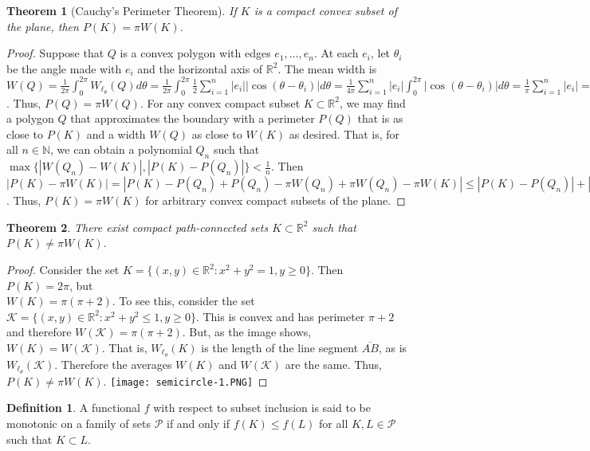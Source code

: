 \documentclass[oneside]{book}
\newtheorem{theorem}{Theorem}[section]
\theoremstyle{definition}
\newtheorem{definition}{Definition}[section]
\begin{document}
\begin{theorem}[Cauchy's Perimeter Theorem]
If $K$ is a compact convex subset of the plane, then $P(K) = \pi W(K)$.
\end{theorem}
\begin{proof}
Suppose that $Q$ is a convex polygon with edges $e_1,\hdots, e_n$. At each $e_i$, let $\theta_i$ be the angle made with $e_i$ and the horizontal axis of $\mathbb{R}^2$. The mean width is $W(Q) = \frac{1}{2\pi}\int_{0}^{2\pi} W_{\ell_\theta}(Q)d\theta = \frac{1}{2\pi} \int_{0}^{2\pi} \frac{1}{2} \sum_{i=1}^{n} |e_i||\cos(\theta-\theta_i)|d\theta = \frac{1}{4\pi}\sum_{i=1}^{n} |e_i|\int_{0}^{2\pi} |\cos(\theta-\theta_i)|d\theta = \frac{1}{\pi} \sum_{i=1}^{n} |e_i| = \frac{1}{\pi} P(Q)$. Thus, $P(Q) = \pi W(Q)$. For any convex compact subset $K\subset \mathbb{R}^2$, we may find a polygon $Q$ that approximates the boundary with a perimeter $P(Q)$ that is as close to $P(K)$ and a width $W(Q)$ as close to $W(K)$ as desired. That is, for all $n\in \mathbb{N}$, we can obtain a polynomial $Q_n$ such that $\max\{|W(Q_n)-W(K)|,|P(K)-P(Q_n)|\}< \frac{1}{n}$. Then $|P(K)-\pi W(K)| = |P(K) - P(Q_n)+P(Q_n)-\pi W(Q_n)+\pi W(Q_n)-\pi W(K)| \leq |P(K)-P(Q_n)|+|P(Q_n)-\pi W(Q_n)|+\pi|W(Q_n)-W(K)| < \frac{1}{n} + 0 + \frac{\pi}{n} = \frac{1+\pi}{n} \rightarrow 0$. Thus, $P(K) = \pi W(K)$ for arbitrary convex compact subsets of the plane.
\end{proof}
 
\begin{theorem}
There exist compact path-connected sets $K\subset \mathbb{R}^2$ such that $P(K) \ne \pi W(K)$.
\end{theorem}
\begin{proof}
Consider the set $K = \{(x,y) \in \mathbb{R}^2: x^2+y^2=1, y\geq 0\}$. Then $P(K) = 2\pi$, but \\ $W(K) = \pi(\pi+2)$. To see this, consider the set $\mathcal{K} = \{(x,y)\in \mathbb{R}^2: x^2 + y^2 \leq 1, y\geq 0\}$. This is convex and has perimeter $\pi+2$ and therefore $W(\mathcal{K}) = \pi(\pi+2)$. But, as the image shows, $W(K) = W(\mathcal{K})$. That is, $W_{\ell_{\theta}}(K)$ is the length of the line segment $\overline{AB}$, as is $W_{\ell_{\theta}}(\mathcal{K})$. Therefore the averages $W(K)$ and $W(\mathcal{K})$ are the same. Thus, $P(K) \ne \pi W(K)$.
\texttt{[image: semicircle-1.PNG]}
\end{proof}

\begin{definition}
A functional $f$ with respect to subset inclusion is said to be monotonic on a family of sets $\mathscr{P}$ if and only if $f(K)\leq f(L)$ for all $K,L \in \mathscr{P}$ such that $K\subset L$.
\end{definition}
\end{document}
